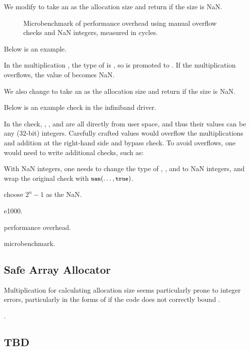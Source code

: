 We modify  to take an  as the
allocation size and return  if the size is NaN.

\begin{figure}
\centering
\small

\caption{Microbenchmark of performance overhead using manual overflow
checks and NaN integers, measured in cycles.}
\label{f:data:nan-micro}
\end{figure}


Below is an example.

In the multiplication , the type of  is
, so  is promoted to .
If the multiplication overflows, the value of  becomes NaN.

We also change  to take an  as the
allocation size and return  if the size is NaN.

\fi

Below is an example check in the infiniband driver.

In the check, , , and  are
all directly from user space, and thus their values can be any
(32-bit) integers.  Carefully crafted values would overflow the
multiplications and addition at the right-hand side and bypass
check.  To avoid overflows, one would need to write additional
checks, such as:

With NaN integers, one needs to change the type of
, , and  to NaN integers,
and wrap the original check with $\cc{nan}(\dots, \cc{true})$.

\fi

choose $2^n-1$ as the NaN.


e1000.

performance overhead.

microbenchmark.

\subsection{Safe Array Allocator}


Multiplication for calculating allocation size seems particularly
prone to integer errors, particularly in the forms of  if the code does not correctly bound .

.

\subsection{TBD}

